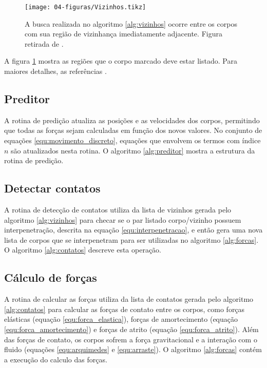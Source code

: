 

\begin{figure}
    \centering
    \texttt{[image: 04-figuras/Vizinhos.tikz]}
    \caption{A busca realizada no algoritmo \ref{alg:vizinhos} ocorre entre os corpos com sua região de vizinhança imediatamente adjacente. Figura retirada de \cite{Dissertacao}.}
    \label{fig:vizinhos}
\end{figure}

A figura \ref{fig:vizinhos} mostra as regiões que o corpo marcado deve estar listado. Para maiores detalhes, as referências \cite{Dissertacao, Computer_Simulation_of_Liquids}.

\subsection{Preditor}
    A rotina de predição atualiza as posições e as velocidades dos corpos, permitindo que todas as forças sejam calculadas em função dos novos valores. No conjunto de equações \ref{equ:movimento_discreto}, equações que envolvem os termos com índice $n$ são atualizados nesta rotina. O algoritmo \ref{alg:preditor} mostra a estrutura da rotina de predição.



\subsection{Detectar contatos}
    A rotina de detecção de contatos utiliza da lista de vizinhos gerada pelo algoritmo \ref{alg:vizinhos} para checar se o par listado corpo/vizinho possuem interpenetração, descrita na equação \ref{equ:interpenetracao}, e então gera uma nova lista de corpos que se interpenetram para ser utilizadas no algoritmo \ref{alg:forcas}. O algoritmo \ref{alg:contatos} descreve esta operação. 



\subsection{Cálculo de forças}
    A rotina de calcular as forças utiliza da lista de contatos gerada pelo algoritmo \ref{alg:contatos} para calcular as forças de contato entre os corpos, como forças elásticas (equação \ref{equ:forca_elastica}), forças de amortecimento (equação \ref{equ:forca_amortecimento}) e forças de atrito (equação \ref{equ:forca_atrito}). Além das forças de contato, os corpos sofrem a força gravitacional e a interação com o fluido (equações \ref{equ:arquimedes} e \ref{equ:arraste}). O algoritmo \ref{alg:forcas} contém a execução do calculo das forças.

